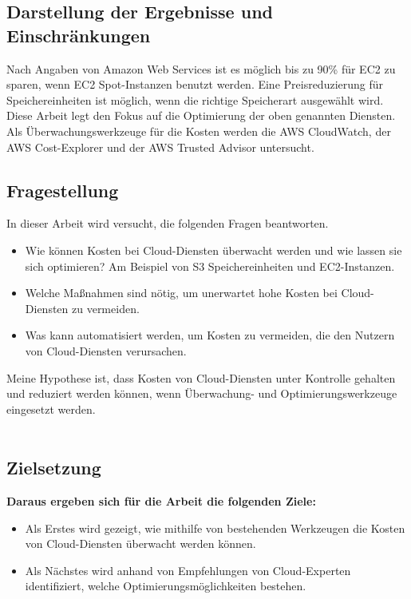 \subsection{Darstellung der Ergebnisse und Einschränkungen}
Nach Angaben von Amazon Web Services ist es möglich bis zu 90\% für EC2 zu sparen, wenn EC2 Spot-Instanzen benutzt werden. Eine Preisreduzierung für Speichereinheiten ist möglich, wenn die richtige Speicherart ausgewählt wird. 
{\cite{AMZ08,AMZ09}} 
\\
Diese Arbeit legt den Fokus auf die Optimierung der oben genannten Diensten.
Als Überwachungswerkzeuge für die Kosten werden die AWS CloudWatch, der AWS Cost-Explorer und der AWS Trusted Advisor untersucht. 

\subsection{Fragestellung}
\begin{flushleft}
In dieser Arbeit wird versucht, die folgenden Fragen beantworten. 
\end{flushleft}

\begin{itemize}
    \item
        Wie können Kosten bei Cloud-Diensten überwacht werden und wie lassen sie sich optimieren? 
        Am Beispiel von S3 Speichereinheiten und EC2-Instanzen.
    \item
        Welche Maßnahmen sind nötig, um unerwartet hohe Kosten bei Cloud-Diensten zu vermeiden.
    \item 
        Was kann automatisiert werden, um Kosten zu vermeiden, die den Nutzern von Cloud-Diensten verursachen.  
\end{itemize}
Meine Hypothese ist, dass Kosten von Cloud-Diensten unter Kontrolle gehalten und
reduziert werden können, wenn Überwachung- und Optimierungswerkzeuge eingesetzt werden.
\\\\

\subsection{Zielsetzung}
\textbf{Daraus ergeben sich für die Arbeit die folgenden Ziele:}\\ 
\begin{itemize}
    \item
        Als Erstes wird gezeigt, wie mithilfe von bestehenden Werkzeugen  die Kosten von Cloud-Diensten überwacht werden können.
    \item
        Als Nächstes wird anhand von Empfehlungen von Cloud-Experten identifiziert, welche Optimierungsmöglichkeiten bestehen.\\
\end{itemize}

